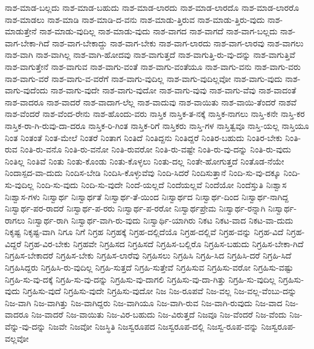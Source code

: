 {ನಾಶ-ಮಾಡ-ಬಲ್ಲದು
ನಾಶ-ಮಾಡ-ಬಹುದು
ನಾಶ-ಮಾಡ-ಲಾರದು
ನಾಶ-ಮಾಡ-ಲಾರದೊ
ನಾಶ-ಮಾಡ-ಲಾರರೊ
ನಾಶ-ಮಾಡಲು
ನಾಶ-ಮಾಡಿ
ನಾಶ-ಮಾಡಿ-ದ-ವನು
ನಾಶ-ಮಾಡು-ತ್ತಿರುವ
ನಾಶ-ಮಾಡು-ತ್ತಿರು-ವುದು
ನಾಶ-ಮಾಡುತ್ತೇನೆ
ನಾಶ-ಮಾಡು-ವುದಿಲ್ಲ
ನಾಶ-ಮಾಡು-ವುದು
ನಾಶ-ವಾಗದ
ನಾಶ-ವಾಗದೆ
ನಾಶ-ವಾಗ-ಬಲ್ಲದು
ನಾಶ-ವಾಗ-ಬೇಕಾ-ಗಿದೆ
ನಾಶ-ವಾಗ-ಬೇಕಾದ್ದು
ನಾಶ-ವಾಗ-ಬೇಕು
ನಾಶ-ವಾಗ-ಲಾರದು
ನಾಶ-ವಾಗ-ಲಾರವು
ನಾಶ-ವಾಗಲು
ನಾಶ-ವಾಗಿ
ನಾಶ-ವಾಗಿಲ್ಲ
ನಾಶ-ವಾಗಿ-ಹೋದವು
ನಾಶ-ವಾಗುತ್ತದೆ
ನಾಶ-ವಾಗುತ್ತಿ-ರು-ವು-ದನ್ನು
ನಾಶ-ವಾಗುತ್ತಿವೆ
ನಾಶ-ವಾಗುತ್ತೇನೆ
ನಾಶ-ವಾಗುವ
ನಾಶ-ವಾಗು-ವಂತೆ
ನಾಶ-ವಾಗು-ವಂತೆಯೂ
ನಾಶ-ವಾಗು-ವನು
ನಾಶ-ವಾಗು-ವರು
ನಾಶ-ವಾಗು-ವರೆ
ನಾಶ-ವಾಗು-ವ-ವರೆಗೆ
ನಾಶ-ವಾಗು-ವುದಿಲ್ಲ
ನಾಶ-ವಾಗು-ವುದಿಲ್ಲವೋ
ನಾಶ-ವಾಗು-ವುದು
ನಾಶ-ವಾಗು-ವುದೆಂದು
ನಾಶ-ವಾಗು-ವುದೇ
ನಾಶ-ವಾಗು-ವುದೋ
ನಾಶ-ವಾಗು-ವುವು
ನಾಶ-ವಾಗು-ವೆವು
ನಾಶ-ವಾದಂತೆ
ನಾಶ-ವಾದರೂ
ನಾಶ-ವಾದರೆ
ನಾಶ-ವಾದಾಗ-ಲೆಲ್ಲ
ನಾಶ-ವಾದುವು
ನಾಶ-ವಾಯಿತು
ನಾಶ-ವಾಯಿ-ತೆಂದರೆ
ನಾಶವೆ
ನಾಶ-ವೆಂದರೆ
ನಾಶ-ವೆಂದ-ರೇನು
ನಾಶ-ಹೊಂದು-ವರು
ನಾಸ್ತಿಕ
ನಾಸ್ತಿಕ-ತ-ನಕ್ಕೆ
ನಾಸ್ತಿಕ-ನಾಗಲು
ನಾಸ್ತಿ-ಕನೇ
ನಾಸ್ತಿ-ಕರ
ನಾಸ್ತಿಕ-ರಾ-ಗಿ-ರುವು-ದಾ-ದರೂ
ನಾಸ್ತಿಕ-ರಿ-ಗಿಂತ
ನಾಸ್ತಿಕ-ರಿಗೆ
ನಾಸ್ತಿಕರು
ನಾಸ್ತಿ-ಗಳ
ನಾಸ್ತಿತ್ವವೂ
ನಾಸ್ತಿ-ಯಲ್ಲ
ನಾಸ್ತಿಯೂ
ನಿಂತ
ನಿಂತಂತೆ
ನಿಂತ-ಮೇಲೆ
ನಿಂತರೆ
ನಿಂತಾಗ
ನಿಂತಿದೆ
ನಿಂತಿದ್ದನು
ನಿಂತಿದ್ದರೆ
ನಿಂತಿರ-ಬಹುದು
ನಿಂತಿರ-ಬೇಕು
ನಿಂತಿ-ರುವ
ನಿಂತಿ-ರು-ವನೊ
ನಿಂತಿ-ರು-ವನೋ
ನಿಂತಿ-ರುವರೋ
ನಿಂತಿ-ರು-ವಷ್ಟೇ
ನಿಂತಿ-ರು-ವು-ದನ್ನು
ನಿಂತಿ-ರು-ವುದು
ನಿಂತಿಲ್ಲ
ನಿಂತಿವೆ
ನಿಂತು
ನಿಂತು-ಕೊಂಡು
ನಿಂತು-ಕೊಳ್ಳಲು
ನಿಂತು-ದಲ್ಲ
ನಿಂತೇ-ಹೋಗುತ್ತದೆ
ನಿಂತೊಡ-ನೆಯೇ
ನಿಂದಾಸ್ಪದ-ವಾ-ದುದು
ನಿಂದಿಸ-ಬೇಡಿ
ನಿಂದಿಸಿ-ಕೊಳ್ಳುವೆವು
ನಿಂದಿ-ಸಿದರೆ
ನಿಂದಿಸುತ್ತಾನೆ
ನಿಂದಿ-ಸು-ವು-ದಕ್ಕೂ
ನಿಂದಿ-ಸು-ವುದಿಲ್ಲ
ನಿಂದಿ-ಸು-ವುದು
ನಿಂದಿ-ಸು-ವುದೇ
ನಿಂದೆ-ಯಲ್ಲದೆ
ನಿಂದೆಯಲ್ಲವೆ
ನಿಂದೆಯೋ
ನಿಂದೆಸ್ತುತಿ
ನಿಃಶ್ವಾಸ
ನಿಃಶ್ವಾಸ-ಗಳು
ನಿಃಸ್ವಾರ್ಥ
ನಿಃಸ್ವಾರ್ಥತೆ
ನಿಃಸ್ವಾರ್ಥ-ತೆ-ಯಿಂದ
ನಿಃಸ್ವಾರ್ಥದ
ನಿಃಸ್ವಾರ್ಥ-ದಿಂದ
ನಿಃಸ್ವಾರ್ಥ-ನಾಗಿದ್ದ
ನಿಃಸ್ವಾರ್ಥ-ಪರ-ರಾದರೆ
ನಿಃಸ್ವಾರ್ಥ-ಪ-ರರು
ನಿಃಸ್ವಾರ್ಥ-ಪ-ರರೋ
ನಿಃಸ್ವಾರ್ಥಪ್ರೇಮ
ನಿಃಸ್ವಾರ್ಥ-ರನ್ನಾಗಿ
ನಿಃಸ್ವಾರ್ಥ-ರಾಗಲು
ನಿಃಸ್ವಾರ್ಥ-ರಾಗಿ
ನಿಃಸ್ವಾರ್ಥ-ವಾಗಿ-ರು-ವುದು
ನಿಃಸ್ವಾರ್ಥಿ-ಯಾಗಿರು
ನಿಕಟ
ನಿಕಟ-ವಾದ
ನಿಕಟ-ವಾ-ದುದು
ನಿಕೃಷ್ಟ
ನಿಕೃಷ್ಟ-ವಾಗಿ
ನಿಗೂ
ನಿಗೆ
ನಿಗ್ರಹ
ನಿಗ್ರಹಕ್ಕೆ
ನಿಗ್ರಹ-ದಲ್ಲಿದೆಯೊ
ನಿಗ್ರಹ-ದಲ್ಲಿವೆ
ನಿಗ್ರಹ-ವನ್ನು
ನಿಗ್ರಹ-ವಿದೆ
ನಿಗ್ರಹ-ವಿದ್ದರೆ
ನಿಗ್ರಹ-ವಿರ-ಬೇಕು
ನಿಗ್ರಹವೇ
ನಿಗ್ರಹಿಸದ
ನಿಗ್ರಹಿಸದೆ
ನಿಗ್ರಹಿಸ-ಬಲ್ಲಿರೊ
ನಿಗ್ರಹಿಸ-ಬಹುದು
ನಿಗ್ರಹಿಸ-ಬೇಕಾ-ಗಿದೆ
ನಿಗ್ರಹಿಸ-ಬೇಕಾದರೆ
ನಿಗ್ರಹಿಸ-ಬೇಕು
ನಿಗ್ರಹಿಸ-ಲಾರೆವು
ನಿಗ್ರಹಿಸಲು
ನಿಗ್ರಹಿಸಿ
ನಿಗ್ರಹಿ-ಸಿದ
ನಿಗ್ರಹಿಸಿ-ದರೆ
ನಿಗ್ರಹಿ-ಸಿದೆ
ನಿಗ್ರಹಿಸಿದ್ದರು
ನಿಗ್ರಹಿಸಿ-ರು-ವುದಿಲ್ಲ
ನಿಗ್ರಹಿ-ಸುತ್ತದೆ
ನಿಗ್ರಹಿ-ಸುತ್ತೇವೆ
ನಿಗ್ರಹಿಸುವ
ನಿಗ್ರಹಿಸು-ವರೋ
ನಿಗ್ರಹಿಸು-ವಷ್ಟು
ನಿಗ್ರಹಿ-ಸು-ವು-ದಕ್ಕೆ
ನಿಗ್ರಹಿ-ಸು-ವು-ದನ್ನು
ನಿಗ್ರಹಿಸು-ವು-ದಾಗಲಿ
ನಿಗ್ರಹಿಸು-ವು-ದಾ-ಗಿತ್ತು
ನಿಗ್ರಹಿ-ಸು-ವುದಿಲ್ಲ
ನಿಗ್ರಹಿಸು-ವುದು
ನಿಗ್ರಹಿಸು-ವುದೆ
ನಿಗ್ರಹಿಸು-ವುದೇ
ನಿಗ್ರಹಿಸು-ವುದೋ
ನಿಜ
ನಿಜ-ರೂಪವೆ
ನಿಜ-ವಲ್ಲ
ನಿಜ-ವಲ್ಲ-ವೆಂಬು-ದನ್ನು
ನಿಜ-ವಾಗಿ
ನಿಜ-ವಾಗಿತ್ತು
ನಿಜ-ವಾಗಿದ್ದರು
ನಿಜ-ವಾಗಿಯೂ
ನಿಜ-ವಾಗಿ-ರುವ
ನಿಜ-ವಾಗಿ-ರುವುದು
ನಿಜ-ವಾದ
ನಿಜ-ವಾದರೂ
ನಿಜ-ವಾದರೆ
ನಿಜ-ವಾಯಿತು
ನಿಜ-ವಿರ-ಬಹುದು
ನಿಜ-ವಿರುತ್ತದೆ
ನಿಜವೂ
ನಿಜ-ವೆಂದರೆ
ನಿಜ-ವೆಂದು
ನಿಜ-ವೆನ್ನು-ವು-ದನ್ನು
ನಿಜವೇ
ನಿಜವೋ
ನಿಜಸ್ಥಿತಿ
ನಿಜಸ್ವರೂಪದ
ನಿಜಸ್ವರೂಪ-ದಲ್ಲಿ
ನಿಜಸ್ವ-ರೂಪ-ವನ್ನು
ನಿಜಸ್ವರೂಪ-ವಲ್ಲವೋ
}
